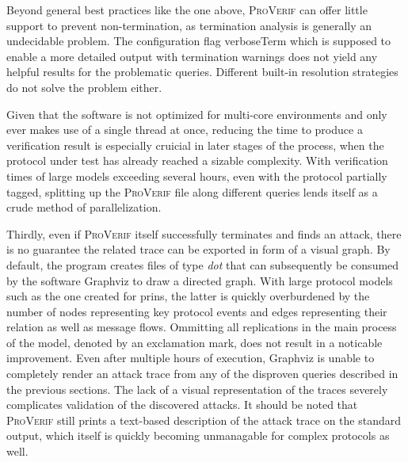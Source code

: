 Beyond general best practices like the one above, \textsc{ProVerif} can offer little support to prevent non-termination, as termination analysis is generally an undecidable problem.
The configuration flag {\sffamily verboseTerm} which is supposed to enable a more detailed output with termination warnings does not yield any helpful results for the problematic queries.
Different built-in resolution strategies do not solve the problem either.\medskip

Given that the software is not optimized for multi-core environments and only ever makes use of a single thread at once, reducing the time to produce a verification result is especially cruicial in later stages of the process, when the protocol under test has already reached a sizable complexity.
With verification times of large models exceeding several hours, even with the protocol partially tagged, splitting up the \textsc{ProVerif} file along different queries lends itself as a crude method of parallelization.\medskip

Thirdly, even if \textsc{ProVerif} itself successfully terminates and finds an attack, there is no guarantee the related trace can be exported in form of a visual graph.
By default, the program creates files of type \textit{dot} that can subsequently be consumed by the software Graphviz to draw a directed graph.
With large protocol models such as the one created for \gls{prins}, the latter is quickly overburdened by the number of nodes representing key protocol events and edges representing their relation as well as message flows.
Ommitting all replications in the main process of the model, denoted by an exclamation mark, does not result in a noticable improvement.
Even after multiple hours of execution, Graphviz is unable to completely render an attack trace from any of the disproven queries described in the previous sections.
The lack of a visual representation of the traces severely complicates validation of the discovered attacks.
It should be noted that \textsc{ProVerif} still prints a text-based description of the attack trace on the standard output, which itself is quickly becoming unmanagable for complex protocols as well.\medskip

